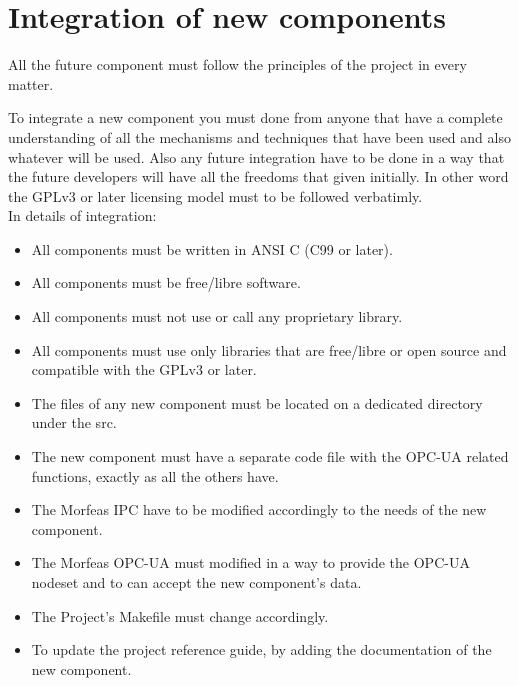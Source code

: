 \newpage
\section{Integration of new components}
All the future component must follow the principles of the project in every matter.

To integrate a new component you must done from anyone that have a complete understanding of all the mechanisms and techniques that have been used and also whatever will be used.
Also any future integration have to be done in a way that the future developers will have all the freedoms that given initially.
In other word the GPLv3 or later licensing model must to be followed verbatimly.\\

In details of integration:
\begin{itemize}
	\item All components must be written in ANSI C (C99 or later).
	\item All components must be free/libre software.
	\item All components must not use or call any proprietary library.
	\item All components must use only libraries that are free/libre or open source and compatible with the GPLv3 or later.
	\item The files of any new component must be located on a dedicated directory under the src.
	\item The new component must have a separate code file with the OPC-UA related functions, exactly as all the others have.
	\item The Morfeas IPC have to be modified accordingly to the needs of the new component.
	\item The Morfeas OPC-UA must modified in a way to provide the OPC-UA nodeset and to can accept the new component's data.
	\item The Project's Makefile must change accordingly.
	\item To update the project reference guide, by adding the documentation of the new component.
\end{itemize}
